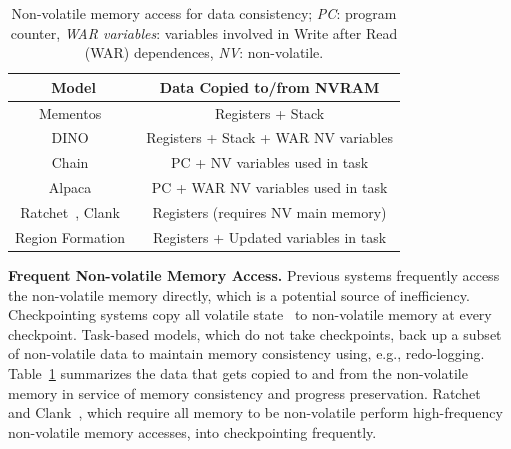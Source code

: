 \begin{table}
    \centering
    \footnotesize
    \begin{tabular}{|c|c|}
        \hline
        Model & Data Copied to/from NVRAM \\
        \hline\hline
        Mementos~\cite{mementos}	& Registers + Stack     \\
        DINO~\cite{dino}	& Registers + Stack + WAR NV variables \\%
        Chain~\cite{chain}	& PC + NV variables used in task\\
        Alpaca~\cite{alpaca}	& PC + WAR NV variables used in task\\
        Ratchet~\cite{ratchet}, Clank~\cite{hicks_isca_2017} & Registers (requires NV main memory) \\
        Region Formation~\cite{baghsorkhi_cgo_2018} & Registers + Updated variables in task \\
        \hline
    \end{tabular}
    \caption{Non-volatile memory access for data consistency; \emph{PC}: program counter, \emph{WAR variables}: variables involved in Write after Read (WAR) dependences, \emph{NV}: non-volatile.}
    \label{table:chechpoint_comparison}
\end{table}


\textbf{Frequent Non-volatile Memory Access.} 
Previous systems frequently access the non-volatile memory directly, which is a potential source of inefficiency.  Checkpointing systems copy all volatile
state~\cite{dino, mementos, ratchet, hicks_isca_2017} to non-volatile memory at
every checkpoint.  Task-based models, which do not take checkpoints, back up a
subset of non-volatile data to maintain memory consistency using, e.g.,
redo-logging.  Table~\ref{table:chechpoint_comparison} summarizes the data that
gets copied to and from the non-volatile memory in service of memory
consistency and progress preservation.  Ratchet~\cite{ratchet} and
Clank~\cite{hicks_isca_2017}, which require all memory to be non-volatile
perform high-frequency non-volatile memory accesses, into checkpointing
frequently.

